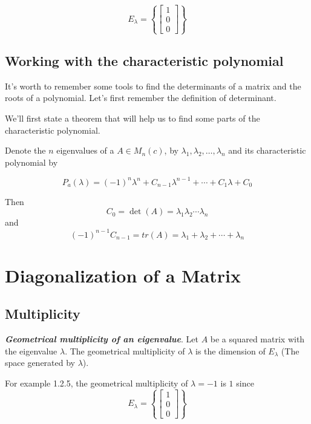 \documentclass{report}
\begin{document}
    $$ E_\lambda = \left\{ \begin{bmatrix}1\\0\\0\end{bmatrix} \right\}$$

    \section{Working with the characteristic polynomial}
    It's worth to remember some tools to find the determinants of a matrix and the roots of a polynomial. Let's first remember the definition of determinant.

    We'll first state a theorem that will help us to find some parts of the characteristic polynomial.

    \begin{thBox}
        Denote the $n$ eigenvalues of a $A \in M_n(c)$, by $\lambda_1, \lambda_2, \dots , \lambda_n$ and its characteristic polynomial by

        $$P_a(\lambda) = (-1)^n\lambda^n + C_{n-1}\lambda^{n-1} + \cdots + C_1\lambda + C_0$$

        Then $$C_0 = \det(A) = \lambda_1 \lambda_2 \cdots \lambda_n$$ and $$(-1)^{n-1}C_{n-1} = tr(A) = \lambda_1 + \lambda_2 + \cdots + \lambda_n$$
    \end{thBox}

    \chapter{Diagonalization of a Matrix}

    \section{Multiplicity}

    \begin{defBox}
        \textit{\textbf{Geometrical multiplicity of an eigenvalue}}. Let $A$ be a squared matrix with the eigenvalue $\lambda$. The geometrical multiplicity of $\lambda$ is the dimension of $E_\lambda$ (The space generated by $\lambda$).
    \end{defBox}

    For example 1.2.5, the geometrical multiplicity of $\lambda = -1$ is $1$ since
    $$E_\lambda = \left\{ \begin{bmatrix}1\\0\\0\end{bmatrix} \right\}$$
\end{document}
